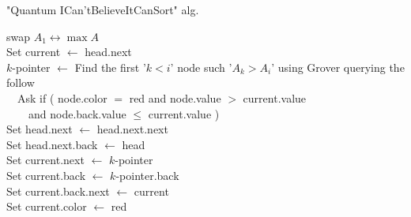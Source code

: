 \documentclass[manuscript,screen,review]{acmart}
\begin{document}
\begin{algorithm}
\SetAlgoLined
{}
\caption{ "Quantum ICan'tBelieveItCanSort"  alg.}
swap $A_{1} \leftrightarrow \max A$ \\
 {
    Set current $\leftarrow$ head.next \\

    $k$-pointer $\leftarrow$ Find the first '$k< i$' node such '$A_{k} > A_{i}$' using Grover querying the follow \\
    \ \ Ask if ( node.color $=$ red and node.value $ > $ current.value \\ 
    \ \ \ \ and node.back.value $\le$ current.value ) \\ 

    Set head.next $\leftarrow$ head.next.next \\
    Set head.next.back $\leftarrow$ head\\
    Set current.next $\leftarrow$ $k$-pointer \\
    Set current.back $\leftarrow$ $k$-pointer.back \\
    Set current.back.next $\leftarrow$ current \\ 
    Set current.color $\leftarrow$ red
}
\end{algorithm}
\printbibliography
\end{document}
